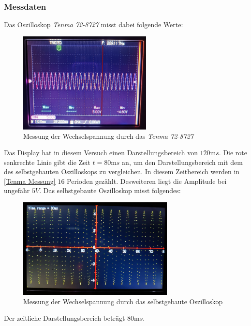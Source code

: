 \subsubsection{Messdaten}
Das Oszilloskop \textit{Tenma 72-8727} misst dabei folgende Werte:
\begin{figure}[h]
	\centering
	\includegraphics[width=0.6\textwidth]{images/sinus_profi_rot.jpg}
	\caption{Messung der Wechselspannung durch das \textit{Tenma 72-8727}}
	\label{Tenma Messung}
\end{figure}
\newline
Das Display hat in diesem Versuch einen Darstellungsbereich von $120\si{\milli s}$.
Die rote senkrechte Linie gibt die Zeit $t=80\si{\milli s}$ an, um den Darstellungsbereich mit dem
des selbstgebauten Oszilloskops zu vergleichen.
In diesem Zeitbereich werden in \autoref{Tenma Messung} $16$ Perioden gezählt.
Desweiteren  liegt die Amplitude bei ungefähr $5V$. \newline
Das selbstgebaute Oszilloskop misst folgendes:
\begin{figure}[h]
	\centering
	\includegraphics[width=0.7\textwidth]{images/sinus_selbstgebaut.jpg}
	\caption{Messung der Wechselspannung durch das selbstgebaute Oszilloskop}
	\label{Selbstgebaut Messung}
\end{figure}
\newline
Der zeitliche Darstellungsbereich beträgt $80\si{\milli s}$.
